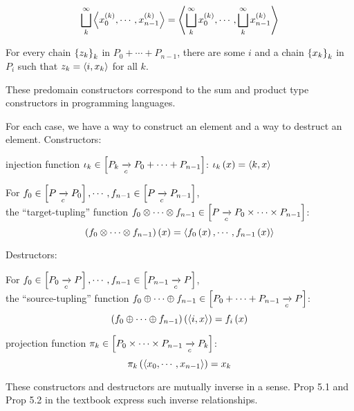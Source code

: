 \begin{enumcirc}
\begin{enumrm}
\begin{enumalpha}
\[				\bigsqcup_k^\infty \left\langle x_0^{(k)}, \cdots, x_{n-1}^{(k)} \right\rangle =
				\left\langle \bigsqcup_k^\infty x_0^{(k)}, \cdots, \bigsqcup_k^\infty x_{n-1}^{(k)} \right\rangle
			\]
			\item
			For every chain $\left\{ z_k \right\}_k$ in $P_0 + \cdots + P_{n-1}$, there are some
			$i$ and a chain $\left\{ x_k \right\}_k$ in $P_i$ such that $z_k = \left\langle i, x_k \right\rangle$
			for all $k$.
		\end{enumalpha}
		\item
		These predomain constructors correspond to the sum and product type
		constructors in programming languages.
		\item
		For each case, we have a way to construct an element and a way to destruct an
		element.
		Constructors:
		\begin{enumalpha}
			\item
			injection function $\iota_k \in \left[ P_k \xrightarrow[c]{} P_0 + \cdots + P_{n-1} \right]$:
			$\iota_k \left( x \right) = \left\langle k, x \right\rangle$
			\item
			For
			$f_0 \in \left[ P \xrightarrow[c]{} P_0 \right], \cdots, f_{n-1} \in \left[ P \xrightarrow[c]{} P_{n-1} \right]$,\\
			the ``target-tupling'' function
			$f_0 \otimes \cdots \otimes f_{n-1} \in \left[ P \xrightarrow[c]{} P_0 \times \cdots \times P_{n-1} \right]$:\\
			\[
				\left( f_0 \otimes \cdots \otimes f_{n-1} \right)\left( x \right) = \left\langle f_0\left( x \right), \cdots, f_{n-1}\left( x \right) \right\rangle
			\]
		\end{enumalpha}
		Destructors:
		\begin{enumalpha}
			\item
			For
			$f_0 \in \left[ P_0 \xrightarrow[c]{} P \right], \cdots, f_{n-1} \in \left[ P_{n-1} \xrightarrow[c]{} P \right]$,\\
			the ``source-tupling'' function
			$f_0 \oplus \cdots \oplus f_{n-1} \in \left[ P_0 + \cdots + P_{n-1} \xrightarrow[c]{} P \right]$:\\
			\[
				\left( f_0 \oplus \cdots \oplus f_{n-1} \right)\left( \left\langle i, x \right\rangle \right) = f_i\left( x \right)
			\]
			\item
			projection function
			$\pi_k \in \left[ P_0 \times \cdots \times P_{n-1} \xrightarrow[c]{} P_k \right]$:
			\[
				\pi_k\left( \left\langle x_0, \cdots, x_{n-1} \right\rangle \right) = x_k
			\]
		\end{enumalpha}
		These constructors and destructors are mutually inverse in a sense.
		Prop 5.1 and Prop 5.2 in the textbook express such inverse relationships.

\end{enumrm}
\end{enumcirc}
